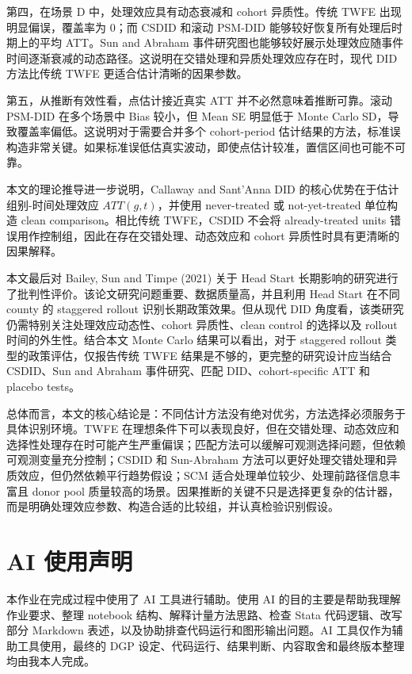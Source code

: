 \documentclass[
  fontset=windows]{ctexart}
\begin{document}
第四，在场景 D 中，处理效应具有动态衰减和 cohort 异质性。传统 TWFE
出现明显偏误，覆盖率为 0；而 CSDID 和滚动 PSM-DID
能够较好恢复所有处理后时期上的平均 ATT。Sun and Abraham
事件研究图也能够较好展示处理效应随事件时间逐渐衰减的动态路径。这说明在交错处理和异质处理效应存在时，现代
DID 方法比传统 TWFE 更适合估计清晰的因果参数。

第五，从推断有效性看，点估计接近真实 ATT 并不必然意味着推断可靠。滚动
PSM-DID 在多个场景中 Bias 较小，但 Mean SE 明显低于 Monte Carlo
SD，导致覆盖率偏低。这说明对于需要合并多个 cohort-period
估计结果的方法，标准误构造非常关键。如果标准误低估真实波动，即使点估计较准，置信区间也可能不可靠。

本文的理论推导进一步说明，Callaway and Sant'Anna DID
的核心优势在于估计组别-时间处理效应 \(ATT(g,t)\)，并使用 never-treated
或 not-yet-treated 单位构造 clean comparison。相比传统 TWFE，CSDID
不会将 already-treated units
错误用作控制组，因此在存在交错处理、动态效应和 cohort
异质性时具有更清晰的因果解释。

本文最后对 Bailey, Sun and Timpe (2021) 关于 Head Start
长期影响的研究进行了批判性评价。该论文研究问题重要、数据质量高，并且利用
Head Start 在不同 county 的 staggered rollout 识别长期政策效果。但从现代
DID 角度看，该类研究仍需特别关注处理效应动态性、cohort 异质性、clean
control 的选择以及 rollout 时间的外生性。结合本文 Monte Carlo
结果可以看出，对于 staggered rollout 类型的政策评估，仅报告传统 TWFE
结果是不够的，更完整的研究设计应当结合 CSDID、Sun and Abraham
事件研究、匹配 DID、cohort-specific ATT 和 placebo tests。

总体而言，本文的核心结论是：不同估计方法没有绝对优劣，方法选择必须服务于具体识别环境。TWFE
在理想条件下可以表现良好，但在交错处理、动态效应和选择性处理存在时可能产生严重偏误；匹配方法可以缓解可观测选择问题，但依赖可观测变量充分控制；CSDID
和 Sun-Abraham
方法可以更好处理交错处理和异质效应，但仍然依赖平行趋势假设；SCM
适合处理单位较少、处理前路径信息丰富且 donor pool
质量较高的场景。因果推断的关键不只是选择更复杂的估计器，而是明确处理效应参数、构造合适的比较组，并认真检验识别假设。

\section{AI 使用声明}\label{ai-ux4f7fux7528ux58f0ux660e}

本作业在完成过程中使用了 AI 工具进行辅助。使用 AI
的目的主要是帮助我理解作业要求、整理 notebook
结构、解释计量方法思路、检查 Stata 代码逻辑、改写部分 Markdown
表述，以及协助排查代码运行和图形输出问题。AI
工具仅作为辅助工具使用，最终的 DGP
设定、代码运行、结果判断、内容取舍和最终版本整理均由我本人完成。
\end{document}
